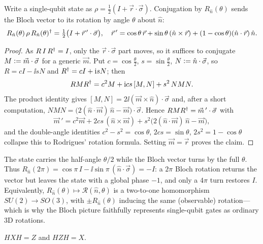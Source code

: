 \begin{proposition}\label{prop:lec01-rodrigues}
Write a single-qubit state as $\rho=\tfrac12(I+\vec r\cdot\vec\sigma)$. Conjugation by
$R_{\hat n}(\theta)$ sends the Bloch vector to its rotation by angle $\theta$ about
$\hat n$:
\[
  R_{\hat n}(\theta)\,\rho\,R_{\hat n}(\theta)^{\dagger}=\tfrac12\big(I+\vec r\,'\cdot\vec\sigma\big),
  \quad
  \vec r\,'=\cos\theta\,\vec r+\sin\theta\,(\hat n\times\vec r)+(1-\cos\theta)(\hat n\cdot\vec r)\,\hat n .
\]
\end{proposition}

\begin{proof}
As $R\,I\,R^{\dagger}=I$, only the $\vec r\cdot\vec\sigma$ part moves, so it suffices to
conjugate $M\vcentcolon=\vec m\cdot\vec\sigma$ for a generic $\vec m$. Put $c=\cos\tfrac{\theta}{2}$,
$s=\sin\tfrac{\theta}{2}$, $N\vcentcolon=\hat n\cdot\vec\sigma$, so $R=cI-\ii sN$ and
$R^{\dagger}=cI+\mathrm{i} sN$; then
\[
  RMR^{\dagger}=c^{2}M+\mathrm{i} cs\,[M,N]+s^{2}\,NMN .
\]
The product identity gives $[M,N]=2\ii(\vec m\times\hat n)\cdot\vec\sigma$ and, after a
short computation, $NMN=\big(2(\hat n\cdot\vec m)\,\hat n-\vec m\big)\cdot\vec\sigma$.
Hence $RMR^{\dagger}=\vec m\,'\cdot\vec\sigma$ with
\[
  \vec m\,'=c^{2}\vec m+2cs\,(\hat n\times\vec m)+s^{2}\big(2(\hat n\cdot\vec m)\,\hat n-\vec m\big),
\]
and the double-angle identities $c^{2}-s^{2}=\cos\theta$, $2cs=\sin\theta$,
$2s^{2}=1-\cos\theta$ collapse this to Rodrigues' rotation formula. Setting
$\vec m=\vec r$ proves the claim.
\end{proof}

\begin{remark}\label{rem:lec01-doublecover}
The state carries the half-angle $\theta/2$ while the Bloch vector turns by the full
$\theta$. Thus $R_{\hat n}(2\pi)=\cos\pi\,I-\ii\sin\pi\,(\hat n\cdot\vec\sigma)=-I$: a
$2\pi$ Bloch rotation returns the vector but leaves the state with a global phase
$-1$, and only a $4\pi$ turn restores $I$. Equivalently, $R_{\hat n}(\theta)\mapsto
\mathcal R(\hat n,\theta)$ is a two-to-one homomorphism $SU(2)\to SO(3)$, with $\pm
R_{\hat n}(\theta)$ inducing the same (observable) rotation---which is why the Bloch
picture faithfully represents single-qubit gates as ordinary $3$D rotations.
\end{remark}

\begin{lemma}\label{lem:lec01-conj}
$H X H = Z$ and $H Z H = X$.
\end{lemma}

